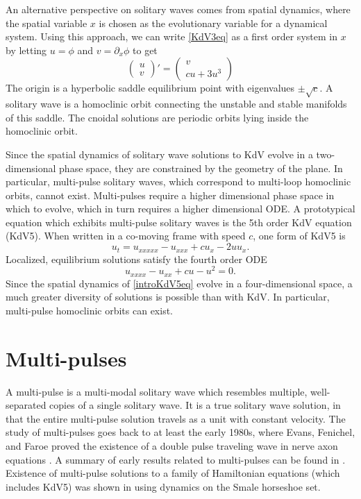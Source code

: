 \documentclass[thesis.tex]{subfiles}
\begin{document}
An alternative perspective on solitary waves comes from spatial dynamics, where the spatial variable $x$ is chosen as the evolutionary variable for a dynamical system. Using this approach, we can write \cref{KdV3eq} as a first order system in $x$ by letting $u = \phi$ and $v = \partial_x \phi$ to get
\begin{equation}\label{KdV3sd}
\begin{pmatrix}u \\ v
\end{pmatrix}'
= \begin{pmatrix}
v \\ c u + 3 u^3
\end{pmatrix}
\end{equation}
The origin is a hyperbolic saddle equilibrium point with eigenvalues $\pm \sqrt{c}$. A solitary wave is a homoclinic orbit connecting the unstable and stable manifolds of this saddle. The cnoidal solutions are periodic orbits lying inside the homoclinic orbit.

Since the spatial dynamics of solitary wave solutions to KdV evolve in a two-dimensional phase space, they are constrained by the geometry of the plane. In particular, multi-pulse solitary waves, which correspond to multi-loop homoclinic orbits, cannot exist. Multi-pulses require a higher dimensional phase space in which to evolve, which in turn requires a higher dimensional ODE. A prototypical equation which exhibits multi-pulse solitary waves is the 5th order KdV equation (KdV5). When written in a co-moving frame with speed $c$, one form of KdV5 is
\begin{equation}\label{introKdV5}
u_t = u_{xxxxx} - u_{xxx} + c u_x - 2 u u_x .
\end{equation}
Localized, equilibrium solutions satisfy the fourth order ODE
\begin{equation}\label{introKdV5eq}
u_{xxxx} - u_{xx} + c u - u^2 = 0.
\end{equation}
Since the spatial dynamics of \cref{introKdV5eq} evolve in a four-dimensional space, a much greater diversity of solutions is possible than with KdV. In particular, multi-pulse homoclinic orbits can exist.

\section{Multi-pulses}

A multi-pulse is a multi-modal solitary wave which resembles multiple, well-separated copies of a single solitary wave. It is a true solitary wave solution, in that the entire multi-pulse solution travels as a unit with constant velocity. The study of multi-pulses goes back to at least the early 1980s, where Evans, Fenichel, and Faroe proved the existence of a double pulse traveling wave in nerve axon equations \cite{Evans1982}. A summary of early results related to multi-pulses can be found in \cite[Section 1]{Sandstede1998}. Existence of multi-pulse solutions to a family of Hamiltonian equations (which includes KdV5) was shown in \cite{Buffoni1996} using dynamics on the Smale horseshoe set. 
\end{document}
